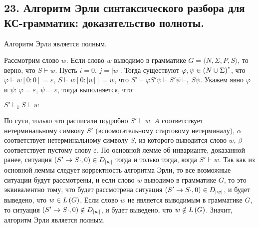 \subsection{23. Алгоритм Эрли синтаксического разбора для КС-грамматик: доказательство полноты.}

\Statement Алгоритм Эрли является полным.

\Proof Рассмотрим слово $w$. Если слово $w$ выводимо в грамматике $G = \langle N, \Sigma, P, S \rangle$, то верно, что $S \vdash w$. Пусть $i = 0$, $j = |w|$. Тогда существуют $\varphi, \psi \in \left({N \cup \Sigma}\right)^*$, что $\varphi \vdash w[0 : 0] = \varepsilon$, $S \vdash w[0 : |w|] = w$, что $S' \vdash \varphi S' \psi \vdash S' \psi \vdash_1 S \psi$. Укажем явно $\varphi$ и $\psi$: $\varphi = \varepsilon$, $\psi = \varepsilon$, тогда выполняется, что:

\begin{center}
    $S' \vdash_1 S \vdash w$
\end{center}

По сути, только что расписали подробно $S' \vdash w$. $A$ соответствует нетерминальному символу $S'$ (вспомогательному стартовому нетерминалу), $\alpha$ соответствует нетерминальному символу $S$, из которого выводится слово $w$, $\beta$ соответствует пустому слову $\varepsilon$. По основной лемме об инварианте, доказанной ранее, ситуация $\left({S' \rightarrow S \cdot, 0}\right) \in D_{|w|}$ тогда и только тогда, когда $S' \vdash w$. Так как из основной леммы следует корректность алгоритма Эрли, то все возможные ситуации будут рассмотрены, и если слово $w$ выводимо в грамматике $G$, то это эквивалентно тому, что будет рассмотрена ситуация $\left({S' \rightarrow S \cdot, 0}\right) \in D_{|w|}$, и будет выведено, что $w \in L \left({G}\right)$. Если слово $w$ не является выводимым в грамматике $G$, то ситуация $\left({S' \rightarrow S \cdot, 0}\right) \notin D_{|w|}$, и будет выведено, что $w \notin L \left({G}\right)$. Значит, алгоритм Эрли является полным. \EndProof